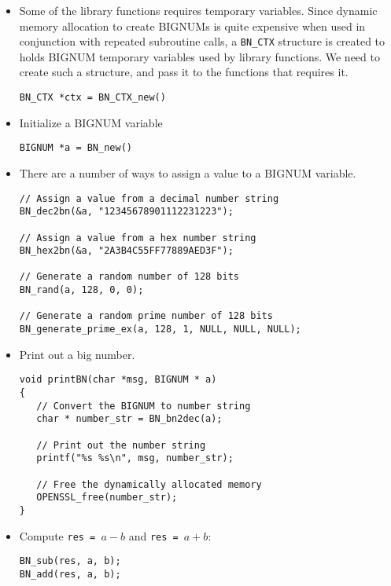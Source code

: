 \begin{itemize}

\item Some of the library functions requires temporary variables.
Since dynamic memory allocation to create BIGNUMs is quite expensive
when used in conjunction with repeated subroutine calls, 
a \texttt{BN\_CTX} structure is created to holds BIGNUM temporary variables 
used by library functions. We need to create such a structure, and pass
it to the functions that requires it.

\begin{lstlisting}
BN_CTX *ctx = BN_CTX_new()
\end{lstlisting}


\item Initialize a BIGNUM variable

\begin{lstlisting}
BIGNUM *a = BN_new()
\end{lstlisting}


\item There are a number of ways to assign a value to a BIGNUM variable.


\begin{lstlisting}
// Assign a value from a decimal number string
BN_dec2bn(&a, "12345678901112231223");

// Assign a value from a hex number string
BN_hex2bn(&a, "2A3B4C55FF77889AED3F");

// Generate a random number of 128 bits
BN_rand(a, 128, 0, 0);

// Generate a random prime number of 128 bits
BN_generate_prime_ex(a, 128, 1, NULL, NULL, NULL);
\end{lstlisting}


\item Print out a big number. 

\begin{lstlisting}
void printBN(char *msg, BIGNUM * a)
{
   // Convert the BIGNUM to number string
   char * number_str = BN_bn2dec(a);

   // Print out the number string
   printf("%s %s\n", msg, number_str);

   // Free the dynamically allocated memory
   OPENSSL_free(number_str);
}
\end{lstlisting}


\item Compute \texttt{res = $a - b$} and \texttt{res = $a + b$}: 

\begin{lstlisting}
BN_sub(res, a, b);
BN_add(res, a, b);
\end{lstlisting}
 



\end{itemize}
